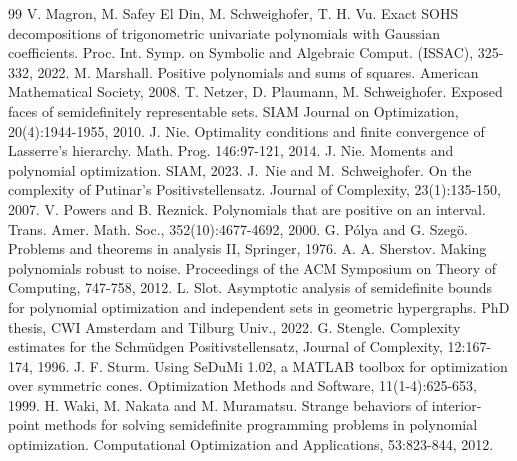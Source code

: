 \documentclass[a4paper,12pt]{article}
\begin{document}
\begin{thebibliography}{99}
V. Magron, M. Safey El Din, M. Schweighofer, T. H. Vu. 
Exact SOHS decompositions of trigonometric univariate polynomials with Gaussian coefficients. 
Proc. Int. Symp. on Symbolic and Algebraic Comput. (ISSAC), 325-332, 2022.
{
M. Marshall. 
Positive polynomials and sums of squares. 
American Mathematical Society, 2008.}
{
T. Netzer, D. Plaumann, M. Schweighofer. 
Exposed faces of semidefinitely representable sets. 
SIAM Journal on Optimization, 20(4):1944-1955, 2010.}
J. Nie. Optimality conditions and finite convergence of Lasserre’s hierarchy. Math. Prog. 146:97-121, 2014.
J. Nie. Moments and polynomial optimization. SIAM, 2023.
J.~Nie and M.~Schweighofer.
On the complexity of Putinar's Positivstellensatz. 
Journal of Complexity, 23(1):135-150, 2007.
V. Powers and B. Reznick. Polynomials that are positive on an interval. Trans. Amer. Math. Soc., 352(10):4677-4692, 2000. 
G. P\'olya and G. Szeg\"o. Problems and theorems in analysis II, Springer, 1976.
A. A. Sherstov. Making polynomials robust to noise. Proceedings of the ACM Symposium on Theory of Computing, 747-758, 2012. 
L. Slot. Asymptotic analysis of semidefinite bounds for polynomial optimization and independent sets in geometric hypergraphs. PhD thesis, CWI Amsterdam and Tilburg Univ., 2022.
G. Stengle. Complexity estimates for the Schm\"udgen Positivstellensatz, Journal of Complexity, 12:167-174, 1996.
J. F. Sturm. 
Using SeDuMi 1.02, a MATLAB toolbox for optimization over symmetric cones. 
Optimization Methods and Software, 11(1-4):625-653, 1999.
H. Waki, M. Nakata and M. Muramatsu. 
Strange behaviors of interior-point methods for solving semidefinite programming problems in polynomial optimization. 
Computational Optimization and Applications, 53:823-844, 2012.
\end{thebibliography}
\end{document}
